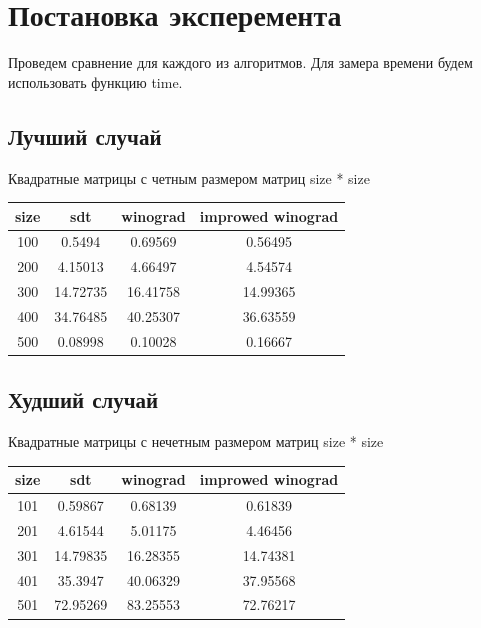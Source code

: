 \documentclass[12pt]{report}
\begin{document}
\section{Постановка эксперемента}
Проведем сравнение для каждого из алгоритмов. Для замера времени будем использовать функцию time.
\newpage
\subsection{Лучший случай}
Квадратные матрицы с четным размером матриц size * size
\begin{center}
	\begin{tabular}{|c c c c|} 
 	\hline
	size & sdt & winograd & improwed winograd \\ [0.5ex] 
 	\hline\hline
 	100 & 0.5494 & 0.69569 & 0.56495 \\
 	\hline
 	200 & 4.15013 & 4.66497 & 4.54574\\
 	\hline
	300 & 14.72735 & 16.41758 & 14.99365 \\
	\hline
	400 & 34.76485 & 40.25307 & 36.63559 \\
	\hline
	500 & 0.08998 & 0.10028 & 0.16667\\
	\hline
	\end{tabular}
\end{center}
\subsection{Худший случай}
Квадратные матрицы с нечетным размером матриц size * size
\begin{center}
	\begin{tabular}{|c c c c|} 
 	\hline
	size & sdt & winograd & improwed winograd \\ [0.5ex] 
 	\hline\hline
 	101 & 0.59867 & 0.68139 & 0.61839 \\
 	\hline
 	201 & 4.61544 & 5.01175 & 4.46456\\
 	\hline
	301 & 14.79835 & 16.28355 & 14.74381 \\
	\hline
	401 & 35.3947 & 40.06329 & 37.95568\\
	\hline
	501 & 72.95269 & 83.25553 & 72.76217\\
	\hline
	\end{tabular}
\end{center}
\end{document}
